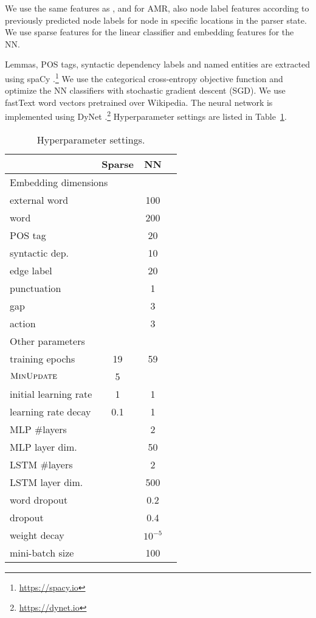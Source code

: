 \documentclass[11pt,a4paper]{article}
\begin{document}
We use the same features as \citet{hershcovich2017a}, and for AMR, also node label features according to
previously predicted node labels for node in specific locations in the parser state.
We use sparse features for the linear classifier and embedding features for the NN.

Lemmas, POS tags, syntactic dependency labels and named entities are extracted using spaCy
\cite{spacy2}.\footnote{\url{https://spacy.io}}
We use the categorical cross-entropy objective function and optimize the
NN classifiers with stochastic gradient descent (SGD).
We use fastText word vectors \cite{bojanowski2016enriching} pretrained over Wikipedia.
The neural network is implemented using DyNet \cite{neubig2017dynet}.\footnote{\url{https://dynet.io}}
Hyperparameter settings are listed in Table~\ref{tab:hyperparams}.

\begin{table}
\begin{tabular}{l|ccc}
& Sparse & NN \\
\hline
\multicolumn{3}{l}{\footnotesize Embedding dimensions} \\
external word & & 100 \\
word & & 200 \\
POS tag & & 20 \\
syntactic dep. & & 10 \\
edge label & & 20 \\
punctuation & & 1 \\
gap & & 3 \\
action & & 3 \\
\hline
\multicolumn{3}{l}{\footnotesize Other parameters} \\
training epochs & 19 & 59 \\
$\textsc{MinUpdate}$ & 5 \\
initial learning rate & 1 & 1 \\
learning rate decay & 0.1 & 1 \\
MLP \#layers & & 2 \\
MLP layer dim. & & 50 \\
LSTM \#layers & & 2 \\
LSTM layer dim. & & 500 \\
word dropout & & 0.2 \\
dropout & & 0.4 \\
weight decay & & $10^{-5}$ \\
mini-batch size & & 100
\end{tabular}
\caption{Hyperparameter settings.\label{tab:hyperparams}}
\end{table}
\end{document}
